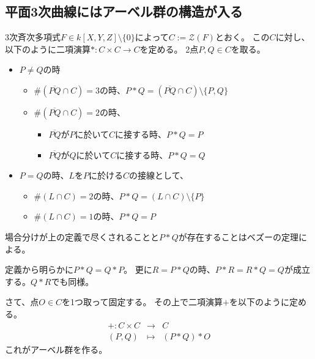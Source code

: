 \documentclass[a4paper]{jsarticle}
\begin{document}
    \subsection{平面3次曲線にはアーベル群の構造が入る}
        \begin{Def}
        3次斉次多項式$F \in k[X,Y,Z] \setminus \{0\}$によって$C:=\mathcal{Z}(F)$とおく。
        この$C$に対し、以下のように二項演算$\ast : C \times C \to C$を定める。
        2点$P, Q \in C$を取る。
            \begin{itemize}
            \item $P \neq Q$の時
                \begin{itemize}
                    \item $\#(\overline{PQ} \cap C)=3$の時、$P \ast Q=(\overline{PQ} \cap C) \setminus \{P, Q\}$
                    \item $\#(\overline{PQ} \cap C)=2$の時、
                        \begin{itemize}
                            \item $\overline{PQ}$が$P$に於いて$C$に接する時、$P \ast Q=P$
                            \item $\overline{PQ}$が$Q$に於いて$C$に接する時、$P \ast Q=Q$
                        \end{itemize}
                \end{itemize}
            \item $P = Q$の時、$L$を$P$に於ける$C$の接線として、
                \begin{itemize}
                    \item $\#(L \cap C)=2$の時、$P \ast Q=(L \cap C) \setminus \{P\}$
                    \item $\#(L \cap C)=1$の時、$P \ast Q=P$
                \end{itemize}
            \end{itemize}
        \end{Def}
        場合分けが上の定義で尽くされることと$P \ast Q$が存在することはベズーの定理による。

        \begin{Remark} \label{remark401}
            定義から明らかに$P \ast Q=Q \ast P$。
            更に$R=P \ast Q$の時、$P \ast R=R \ast Q=Q$が成立する。$Q \ast R$でも同様。
        \end{Remark}

        さて、点$O \in C$を1つ取って固定する。
        その上で二項演算$+$を以下のように定める。
        \begin{eqnarray*}
            + : C \times C &\to& C \\
            (P, Q) &\mapsto& (P \ast Q) \ast O
        \end{eqnarray*}
        これがアーベル群を作る。
\end{document}
